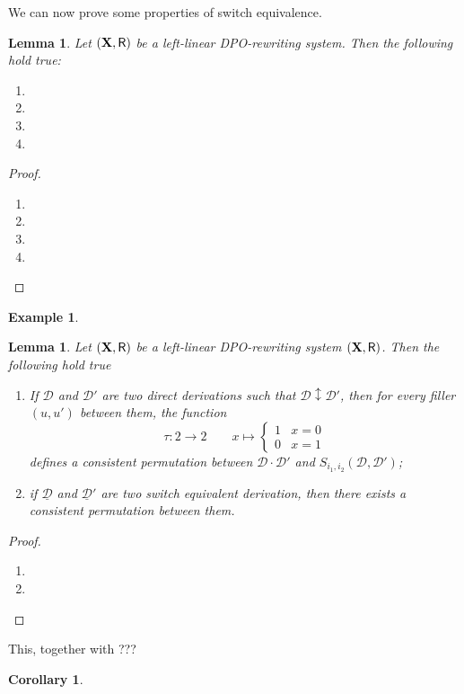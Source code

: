 \documentclass[a4paper]{article}
\def\R{\mathsf{R}}
\def\X{\textbf {\textup{X}}}
\newcommand{\dder}[1]{\mathscr{#1}}
\newcommand{\sder}[2]{S_{i_1,i_2}(\mathscr{#1}, \mathscr{#2})}
\newcommand{\der}[1]{\underline{\dder{#1}}}
\newtheorem{lemma}[theorem]{Lemma}
\newtheorem{corollary}[theorem]{Corollary}
\theoremstyle{definition}
\newtheorem{example}[theorem]{Example}
\begin{document}
We can now prove some properties of switch equivalence.
\begin{lemma}Let $(\X, \R)$ be a left-linear DPO-rewriting system. Then the following hold true: 
	\begin{enumerate}
		\item 
		\item 
		\item 
		\item 
	\end{enumerate}
\end{lemma}
\begin{proof}\begin{enumerate}
		\item 
		\item 
		\item 
		\item \qedhere 
	\end{enumerate}
\end{proof}


\begin{example}
\end{example}



\begin{lemma}\label{lem:consperm} Let $(\X, \R)$ be a left-linear DPO-rewriting system $(\X, \R)$. Then the following hold true
	\begin{enumerate}
		\item If $\dder{D}$ and $\dder{D'}$ are two direct derivations such that $\dder{D}\updownarrow \dder{D'}$, then for every filler $(u,u')$ between them, the function
		\[\tau\colon 2\to2 \qquad x \mapsto \begin{cases}
			1 & x=0\\
			0 & x=1
		\end{cases}\]
		defines a consistent permutation between $\dder{D}\cdot \dder{D}'$ and $\sder{D}{D'}$;
		\item if $\der{D}$ and $\der{D}'$ are two switch equivalent derivation, then there exists a consistent permutation between them.
	\end{enumerate}
\end{lemma}
\begin{proof}
	\begin{enumerate}
		\item 
		\item \qedhere 
	\end{enumerate}
\end{proof}
 This, together with ???
\begin{corollary}
\end{corollary}
\end{document}
